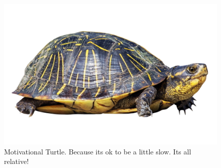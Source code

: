 \documentclass[reprint,english,notitlepage]{revtex4-2}
\begin{document}
\begin{figure}[h!]
  \centering
  \includegraphics[scale = .125]{figures/Turtle.png}
  \caption{Motivational Turtle. Because its ok to be a little slow. Its all relative!}
  \label{fig: Turtle}
\end{figure}
\end{document}
